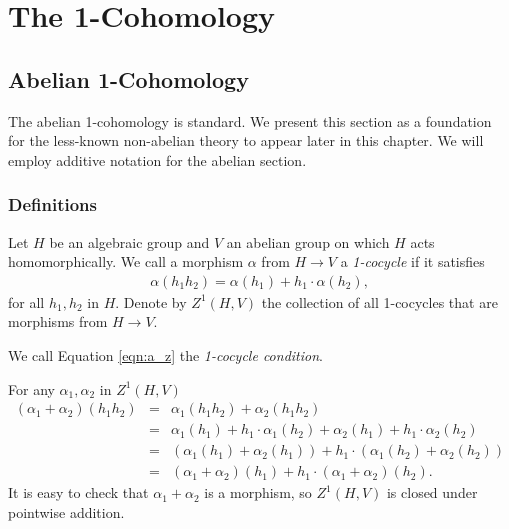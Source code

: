 
\chapter{The 1-Cohomology}
\label{Chapter3}

\section{Abelian 1-Cohomology}
The abelian 1-cohomology is standard. We present this section as a foundation for the less-known non-abelian theory to appear later in this chapter. We will employ additive notation for the abelian section.

\subsection{Definitions}
Let $H$ be an algebraic group and $V$ an abelian group on which $H$ acts homomorphically. We call a morphism $\alpha$ from $H\rightarrow V$ a  \emph{1-cocycle} if it satisfies
\begin{eqnarray}
  \alpha(h_1h_2) = \alpha(h_1) + h_1\cdot\alpha(h_2),
  \label{eqn:a_z}
\end{eqnarray}
for all $h_1, h_2$ in $H$. Denote by $Z^1\left( H, V \right)$ the collection of all 1-cocycles that are morphisms from $H\rightarrow V$.

We call Equation \ref{eqn:a_z} the \emph{1-cocycle condition}.

For any $\alpha_1, \alpha_2$ in $Z^1\left(H, V\right)$
\begin{eqnarray*}
	\left(\alpha_1 + \alpha_2\right)(h_1h_2) &=& \alpha_1(h_1h_2) +  \alpha_2(h_1h_2) \\
	&=& \alpha_1(h_1) + h_1\cdot\alpha_1(h_2) +  \alpha_2(h_1) + h_1\cdot\alpha_2(h_2)\\
	&=& \left( \alpha_1(h_1) + \alpha_2(h_1) \right) + h_1\cdot\left(\alpha_1(h_2) + \alpha_2(h_2)\right) \\
	&=& \left(\alpha_1+\alpha_2\right)(h_1) + h_1\cdot\left(\alpha_1 + \alpha_2\right)(h_2).
\end{eqnarray*}
It is easy to check that $\alpha_1 + \alpha_2$ is a morphism, so $Z^1(H, V)$ is closed under pointwise addition.

